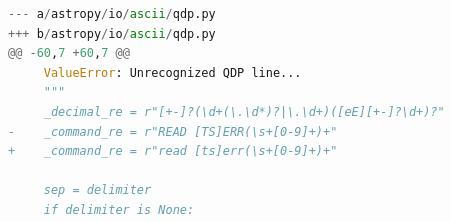 \lstset{linewidth=\linewidth}
\lstset{basicstyle=\small\ttfamily}

\begin{lstlisting}[language=Python,belowskip=-0.8 \baselineskip]
--- a/astropy/io/ascii/qdp.py
+++ b/astropy/io/ascii/qdp.py
@@ -60,7 +60,7 @@
     ValueError: Unrecognized QDP line...
     """
     _decimal_re = r"[+-]?(\d+(\.\d*)?|\.\d+)([eE][+-]?\d+)?"
-    _command_re = r"READ [TS]ERR(\s+[0-9]+)+"
+    _command_re = r"read [ts]err(\s+[0-9]+)+"
 
     sep = delimiter
     if delimiter is None:
\end{lstlisting}
